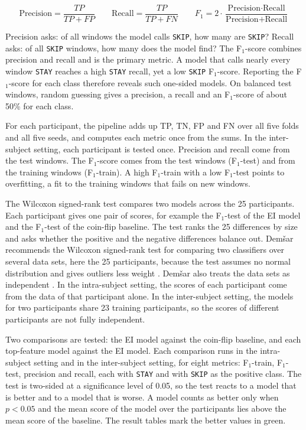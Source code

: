 \documentclass[12pt,a4paper]{report}
\begin{document}
\[ \text{Precision} = \frac{TP}{TP + FP} \qquad \text{Recall} = \frac{TP}{TP + FN} \qquad F_1 = 2 \cdot \frac{\text{Precision} \cdot \text{Recall}}{\text{Precision} + \text{Recall}} \]

Precision asks: of all windows the model calls \texttt{SKIP}, how many are \texttt{SKIP}? Recall asks: of all \texttt{SKIP} windows, how many does the model find? The F\(_1\)-score combines precision and recall and is the primary metric. A model that calls nearly every window \texttt{STAY} reaches a high \texttt{STAY} recall, yet a low \texttt{SKIP} F\(_1\)-score. Reporting the F\(_1\)-score for each class therefore reveals such one-sided models. On balanced test windows, random guessing gives a precision, a recall and an F\(_1\)-score of about 50\% for each class.

For each participant, the pipeline adds up TP, TN, FP and FN over all five folds and all five seeds, and computes each metric once from the sums. In the inter-subject setting, each participant is tested once. Precision and recall come from the test windows. The F\(_1\)-score comes from the test windows (F\(_1\)-test) and from the training windows (F\(_1\)-train). A high F\(_1\)-train with a low F\(_1\)-test points to overfitting, a fit to the training windows that fails on new windows.

The Wilcoxon signed-rank test compares two models across the 25 participants. Each participant gives one pair of scores, for example the F\(_1\)-test of the EI model and the F\(_1\)-test of the coin-flip baseline. The test ranks the 25 differences by size and asks whether the positive and the negative differences balance out. Demšar recommends the Wilcoxon signed-rank test for comparing two classifiers over several data sets, here the 25 participants, because the test assumes no normal distribution and gives outliers less weight \cite{demsar_statistical_2006}. Demšar also treats the data sets as independent \cite{demsar_statistical_2006}. In the intra-subject setting, the scores of each participant come from the data of that participant alone. In the inter-subject setting, the models for two participants share 23 training participants, so the scores of different participants are not fully independent.

Two comparisons are tested: the EI model against the coin-flip baseline, and each top-feature model against the EI model. Each comparison runs in the intra-subject setting and in the inter-subject setting, for eight metrics: F\(_1\)-train, F\(_1\)-test, precision and recall, each with \texttt{STAY} and with \texttt{SKIP} as the positive class. The test is two-sided at a significance level of 0.05, so the test reacts to a model that is better and to a model that is worse. A model counts as better only when \(p < 0.05\) and the mean score of the model over the participants lies above the mean score of the baseline. The result tables mark the better values in green.
\end{document}

